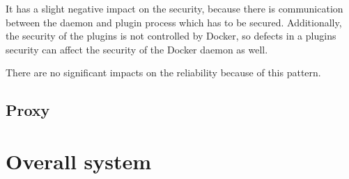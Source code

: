 It has a slight negative impact on the security, because there is communication between the daemon and plugin process which has to be secured. Additionally, the security of the plugins is not controlled by Docker, so defects in a plugins security can affect the security of the Docker daemon as well. 

There are no significant impacts on the reliability because of this pattern.

\subsection{Proxy}

\section{Overall system}